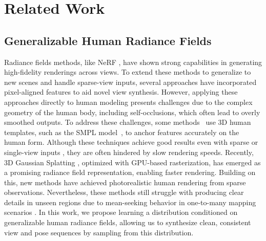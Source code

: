 \section{Related Work}
\label{sec:related_work}

\subsection{Generalizable Human Radiance Fields}

Radiance fields methods, like NeRF \cite{mildenhall2021nerf}, have shown strong capabilities in generating high-fidelity renderings across views. To extend these methods to generalize to new scenes and handle sparse-view inputs, several approaches \cite{yu2021pixelnerf, saito2019pifu, wang2022attention} have incorporated pixel-aligned features to aid novel view synthesis. However, applying these approaches directly to human modeling presents challenges due to the complex geometry of the human body, including self-occlusions, which often lead to overly smoothed outputs. To address these challenges, some methods~\cite{kwon2021neural, kwon2023neural, Zhao_2022_CVPR, peng2021animatable, peng2021neural, dong2022totalselfscan,dong2023ivs} use 3D human templates, such as the SMPL model~\cite{loper2015smpl}, to anchor features accurately on the human form. Although these techniques achieve good results even with sparse or single-view inputs \cite{hu2023sherf}, they are often hindered by slow rendering speeds. Recently, 3D Gaussian Splatting \cite{kerbl20233d}, optimized with GPU-based rasterization, has emerged as a promising radiance field representation, enabling faster rendering. Building on this, new methods \cite{zheng2024gps,kwon2024generalizable, zhuang2024idolinstant} have achieved photorealistic human rendering from sparse observations. Nevertheless, these methods still struggle with producing clear details in unseen regions due to mean-seeking behavior in one-to-many mapping scenarios \cite{liu2021neural, kwon2024deliffas}. In this work, we propose learning a distribution conditioned on generalizable human radiance fields, allowing us to synthesize clean, consistent view and pose sequences by sampling from this distribution.



